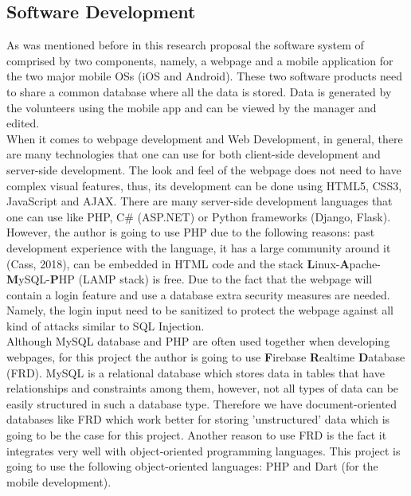 \documentclass[version=last,fontsize=13pt]{scrartcl}
\begin{document}
\subsection{Software Development}
 	As was mentioned before in this research proposal the software system of comprised by two components, namely, a webpage and a mobile application for the two major mobile OSs (iOS and Android). These two software products need to share a common database where all the data is stored. Data is generated by the volunteers using the mobile app and can be viewed by the manager and edited.\\
	\indent
	When it comes to webpage development and Web Development, in general, there are many technologies that one can use for both client-side development and server-side development. The look and feel of the webpage does not need to have complex visual features, thus, its development can be done using HTML5, CSS3, JavaScript and AJAX. There are many server-side development languages that one can use like PHP, C\# (ASP.NET) or Python frameworks (Django, Flask). However, the author is going to use PHP due to the following reasons: past development experience with the language, it has a large community around it (Cass, 2018), can be embedded in HTML code and the stack \textbf{L}inux-\textbf{A}pache-\textbf{M}ySQL-\textbf{P}HP (LAMP stack) is free. Due to the fact that the webpage will contain a login feature and use a database extra security measures are needed. Namely, the login input need to be sanitized to protect the webpage against all kind of attacks similar to  SQL Injection.\\ 
	\indent
	Although MySQL database and PHP are often used together when developing webpages, for this project the author is going to use \textbf{F}irebase \textbf{R}ealtime \textbf{D}atabase (FRD). MySQL is a relational database which stores data in tables that have relationships and constraints among them, however, not all types of data can be easily structured in such a database type. Therefore we have document-oriented databases like FRD which work better for storing 'unstructured' data which is going to be the case for this project. Another reason to use FRD is the fact it integrates very well with object-oriented programming languages. This project is going to use the following object-oriented languages: PHP and Dart (for the mobile development).\\ 
	\indent
\end{document}
